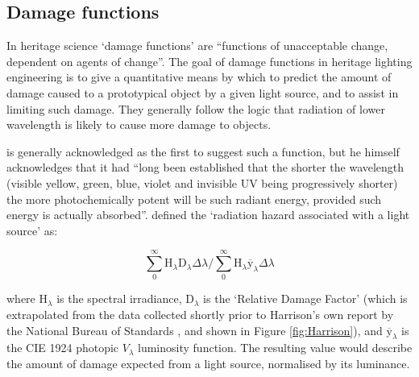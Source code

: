 \subsection{Damage functions} \label{sec:DamageIndex}

In heritage science `damage functions' are ``functions of unacceptable change, dependent on agents of change''\citep{strlic_damage_2013}. The goal of damage functions in heritage lighting engineering is to give a quantitative means by which to predict the amount of damage caused to a prototypical object by a given light source, and to assist in limiting such damage. They generally follow the logic that radiation of lower wavelength is likely to cause more damage to objects.

\citet{harrison_report_1953} is generally acknowledged as the first to suggest such a function, but he himself acknowledges that it had ``long been established that the shorter the wavelength (visible yellow, green, blue, violet and invisible UV being progressively shorter) the more photochemically potent will be such radiant energy, provided such energy is actually absorbed''. \citet[p.9]{harrison_report_1953} defined the `radiation hazard associated with a light source' as:

\begin{equation}
    \sum_{0}^{\infty} \mathrm{H}_{\lambda} \mathrm{D}_{\lambda} \Delta \lambda / \sum_{0}^{\infty} \mathrm{H}_{\lambda} \overline{\mathrm{y}}_{\lambda} \Delta \lambda
    \label{eq:Harrison}
\end{equation}

where $\mathrm{H}_{\lambda}$ is the spectral irradiance, $\mathrm{D}_{\lambda}$ is the `Relative Damage Factor' (which is extrapolated from the data collected shortly prior to Harrison's own report by the National Bureau of Standards \citep{noauthor_preservation_1951}, and shown in Figure \ref{fig:Harrison}), and $\overline{\mathrm{y}}_{\lambda}$ is the CIE 1924 photopic $V_{\lambda}$ luminosity function. The resulting value would describe the amount of damage expected from a light source, normalised by its luminance.

